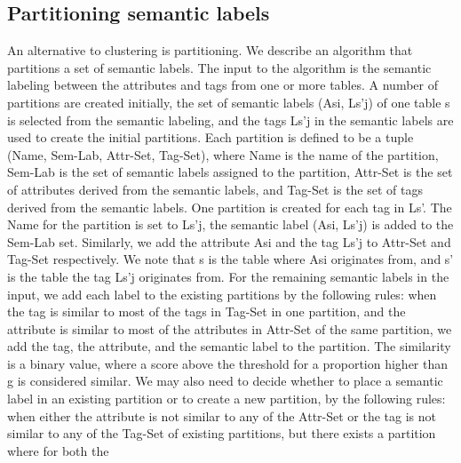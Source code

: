 \subsection{Partitioning semantic labels}
\label{ssec:PartitioningSemanticLabels}

An alternative to clustering is partitioning. We describe an algorithm that partitions a set of semantic labels. The input to the algorithm is the semantic labeling between the attributes and tags from one or more tables. A number of partitions are created initially, the set of semantic labels (Asi, Ls'j) of one table s is selected from the semantic labeling, and the tags Ls'j in the semantic labels are used to create the initial partitions. Each partition is defined to be a tuple (Name, Sem-Lab, Attr-Set, Tag-Set), where Name is the name of the partition, Sem-Lab is the set of semantic labels assigned to the partition, Attr-Set is the set of attributes derived from the semantic labels, and Tag-Set is the set of tags derived from the semantic labels. One partition is created for each tag in Ls'. The Name for the partition is set to Ls'j, the semantic label (Asi, Ls'j) is added to the Sem-Lab set. Similarly, we add the attribute Asi and the tag Ls'j to Attr-Set and Tag-Set respectively. We note that s is the table where Asi originates from, and s' is the table the tag Ls'j originates from.
For the remaining semantic labels in the input, we add each label to the existing partitions by the following rules: when the tag is similar to most of the tags in Tag-Set in one partition, and the attribute is similar to most of the attributes in Attr-Set of the same partition, we add the tag, the attribute, and the semantic label to the partition. The similarity is a binary value, where a score above the threshold  for a proportion higher than g is considered similar. We may also need to decide whether to place a semantic label in an existing partition or to create a new partition, by the following rules: when either the attribute is not similar to any of the Attr-Set or the tag is not similar to any of the Tag-Set of existing partitions, but there exists a partition where for both the

